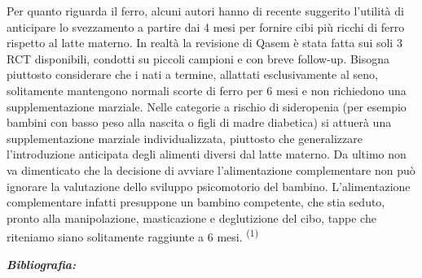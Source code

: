 \documentclass[]{article}
\begin{document}
Per quanto riguarda il ferro, alcuni autori hanno di recente suggerito
l'utilità di anticipare lo svezzamento a partire dai 4 mesi per fornire
cibi più ricchi di ferro rispetto al latte materno. In realtà la
revisione di Qasem è stata fatta sui soli 3 RCT disponibili, condotti su
piccoli campioni e con breve follow-up. Bisogna piuttosto considerare
che i nati a termine, allattati esclusivamente al seno, solitamente
mantengono normali scorte di ferro per 6 mesi e non richiedono una
supplementazione marziale. Nelle categorie a rischio di sideropenia (per
esempio bambini con basso peso alla nascita o figli di madre diabetica)
si attuerà una supplementazione marziale individualizzata, piuttosto che
generalizzare l'introduzione anticipata degli alimenti diversi dal latte
materno. Da ultimo non va dimenticato che la decisione di avviare
l'alimentazione complementare non può ignorare la valutazione dello
sviluppo psicomotorio del bambino. L'alimentazione complementare infatti
presuppone un bambino competente, che stia seduto, pronto alla
manipolazione, masticazione e deglutizione del cibo, tappe che riteniamo
siano solitamente raggiunte a 6 mesi. \textsuperscript{(1)}

\emph{\textbf{Bibliografia:}}
\end{document}
